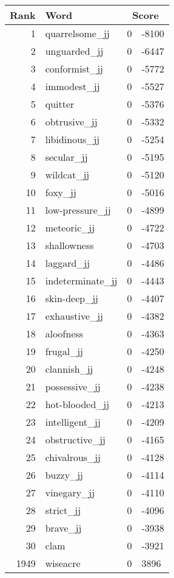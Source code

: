 \begin{longtable}[!htbp]{| rlr@{.}l |}
    \hline
    \textbf{Rank} & \textbf{Word} & \multicolumn{2}{c|}{\textbf{Score}} \\
    \hline
    \endhead
    1 & quarrelsome\_jj & 0 & -8100 \\
    2 & unguarded\_jj & 0 & -6447 \\
    3 & conformist\_jj & 0 & -5772 \\
    4 & immodest\_jj & 0 & -5527 \\
    5 & quitter & 0 & -5376 \\
    6 & obtrusive\_jj & 0 & -5332 \\
    7 & libidinous\_jj & 0 & -5254 \\
    8 & secular\_jj & 0 & -5195 \\
    9 & wildcat\_jj & 0 & -5120 \\
    10 & foxy\_jj & 0 & -5016 \\
    11 & low-pressure\_jj & 0 & -4899 \\
    12 & meteoric\_jj & 0 & -4722 \\
    13 & shallowness & 0 & -4703 \\
    14 & laggard\_jj & 0 & -4486 \\
    15 & indeterminate\_jj & 0 & -4443 \\
    16 & skin-deep\_jj & 0 & -4407 \\
    17 & exhaustive\_jj & 0 & -4382 \\
    18 & aloofness & 0 & -4363 \\
    19 & frugal\_jj & 0 & -4250 \\
    20 & clannish\_jj & 0 & -4248 \\
    21 & possessive\_jj & 0 & -4238 \\
    22 & hot-blooded\_jj & 0 & -4213 \\
    23 & intelligent\_jj & 0 & -4209 \\
    24 & obstructive\_jj & 0 & -4165 \\
    25 & chivalrous\_jj & 0 & -4128 \\
    26 & buzzy\_jj & 0 & -4114 \\
    27 & vinegary\_jj & 0 & -4110 \\
    28 & strict\_jj & 0 & -4096 \\
    29 & brave\_jj & 0 & -3938 \\
    30 & clam & 0 & -3921 \\
    1949 & wiseacre & 0 & 3896 \\

\end{longtable}
